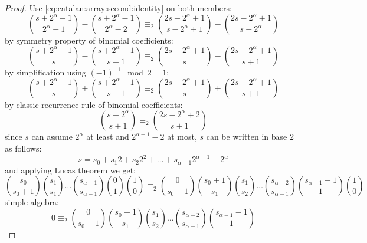 \begin{proof}
    Use \autoref{eq:catalan:array:second:identity} on both members:
    \begin{displaymath}
        {{s+2^{\alpha}-1}\choose{2^{\alpha}-1}}- {{s+2^{\alpha}-1}\choose{2^{\alpha}-2}} \equiv_{2}
        {{2s-2^{\alpha}+1}\choose{s-2^{\alpha}+1}}- {{2s-2^{\alpha}+1}\choose{s-2^{\alpha}}}
    \end{displaymath}
    by symmetry property of binomial coefficients:
    \begin{displaymath}
        {{s+2^{\alpha}-1}\choose{s}}- {{s+2^{\alpha}-1}\choose{s+1}} \equiv_{2}
        {{2s-2^{\alpha}+1}\choose{s}}- {{2s-2^{\alpha}+1}\choose{s+1}}
    \end{displaymath}
    by simplification using $(-1)^{-1}\mod 2=1$:
    \begin{displaymath}
        {{s+2^{\alpha}-1}\choose{s}}+ {{s+2^{\alpha}-1}\choose{s+1}} \equiv_{2}
        {{2s-2^{\alpha}+1}\choose{s}}+ {{2s-2^{\alpha}+1}\choose{s+1}}
    \end{displaymath}
    by classic recurrence rule of binomial coefficients:
    \begin{displaymath}
        {{s+2^{\alpha}}\choose{s+1}} \equiv_{2} {{2s-2^{\alpha}+2}\choose{s+1}}
    \end{displaymath}
    since $s$ can assume $2^{\alpha}$ at least and $2^{\alpha+1}-2$ at most,
    $s$ can be written in base $2$ as follows:
    \begin{displaymath}
        s=s_{0} + s_{1}2 + s_{2}2^{2}+\ldots+s_{\alpha-1}2^{\alpha-1}+2^{\alpha}
    \end{displaymath}
    and applying Lucas theorem we get:
    \begin{displaymath}
        {{s_{0}}\choose{s_{0}+1}}
        {{s_{1}}\choose{s_{1}}}
        \ldots
        {{s_{\alpha-1}}\choose{s_{\alpha-1}}}
        {{0}\choose{1}}
        {{1}\choose{0}}
        \equiv_{2}
        {{0}\choose{s_{0}+1}}
        {{s_{0}+1}\choose{s_{1}}}
        {{s_{1}}\choose{s_{2}}}
        \ldots
        {{s_{\alpha-2}}\choose{s_{\alpha-1}}}
        {{s_{\alpha-1}-1}\choose{1}}
        {{1}\choose{0}}
    \end{displaymath}
    simple algebra:
    \begin{displaymath}
        0
        \equiv_{2}
        {{0}\choose{s_{0}+1}}
        {{s_{0}+1}\choose{s_{1}}}
        {{s_{1}}\choose{s_{2}}}
        \ldots
        {{s_{\alpha-2}}\choose{s_{\alpha-1}}}
        {{s_{\alpha-1}-1}\choose{1}}

\end{displaymath}
\end{proof}
